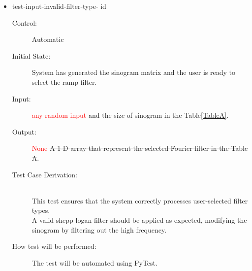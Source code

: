 \documentclass[12pt, titlepage]{article}
\newcounter{testnum}
\newcommand{\dthetestnum}{id\thetestnum}
\newcommand{\add}{\textcolor{red}}
\begin{document}
\begin{itemize}
\item{test-input-invalid-filter-type- \label{id4} \dthetestnum}
\begin{description}
\item[Control:] Automatic


\item[Initial State:] System has generated the sinogram matrix and the user is
  ready to select the ramp filter.

\item[Input:] \add{any random input} and the size of sinogram in the Table\ref{TableA}.

\item[Output:] \add{None} \st{A 1-D array that represent the selected Fourier
    filter in the Table A}.

\item[Test Case Derivation:] \hfill \\
  This test ensures that the system correctly processes
  user-selected filter types.\\
  A valid shepp-logan filter should be applied as expected, modifying the
  sinogram by filtering out the high frequency.

\item[How test will be performed:] The test will be automated using PyTest.
\end{description}
\end{itemize}
\end{document}
